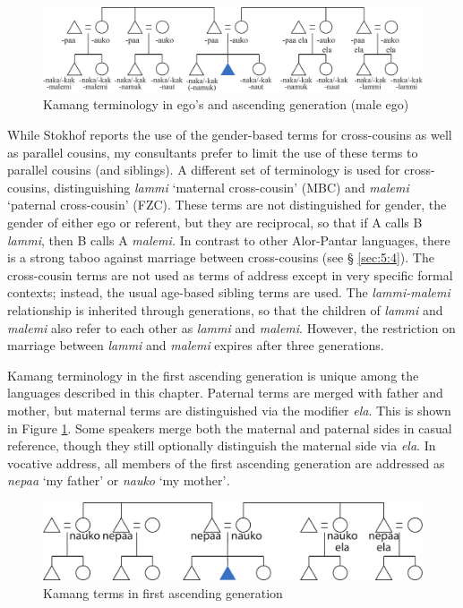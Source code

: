 \begin{figure}
\includegraphics[width=\textwidth]{figures/Holton_ch5_fig12.pdf}
\caption{Kamang terminology in ego's and ascending generation (male ego) }
\end{figure}  

 

While Stokhof reports the use of the gender-based terms for cross-cousins as well as parallel cousins, my consultants prefer to limit the use of these terms to parallel cousins (and siblings). A different set of terminology is used for cross-cousins, distinguishing \textit{lammi} `maternal cross-cousin' (MBC) and \textit{malemi} `paternal cross-cousin' (FZC). These terms are not distinguished for gender, the gender of either ego or referent, but they are reciprocal, so that if A calls B \textit{lammi}, then B calls A \textit{malemi.} In contrast to other Alor-Pantar languages, there is a strong taboo against marriage between cross-cousins (see {\S} \ref{sec:5:4}). The cross-cousin terms are not used as terms of address except in very specific formal contexts; instead, the usual age-based sibling terms are used. The \textit{lammi-malemi} relationship is inherited through generations, so that the children of \textit{lammi} and \textit{malemi} also refer to each other as \textit{lammi} and \textit{malemi}. However, the restriction on marriage between \textit{lammi} and \textit{malemi} expires after three generations.

Kamang terminology in the first ascending generation is unique among the languages described in this chapter. Paternal terms are merged with father and mother, but maternal terms are distinguished via the modifier \textit{ela}. This is shown in Figure \ref{fig_kamang_ascending}. Some speakers merge both the maternal and paternal sides in casual reference, though they still optionally distinguish the maternal side via \textit{ela}. In vocative address, all members of the first ascending generation are addressed as \textit{nepaa} `my father' or \textit{nauko} `my mother'\textit{.} 

\begin{figure}
\includegraphics[width=\textwidth]{figures/Holton_ch5_fig13.pdf}
\caption{Kamang terms in first ascending generation}
\label{fig_kamang_ascending}
\end{figure}  
 

